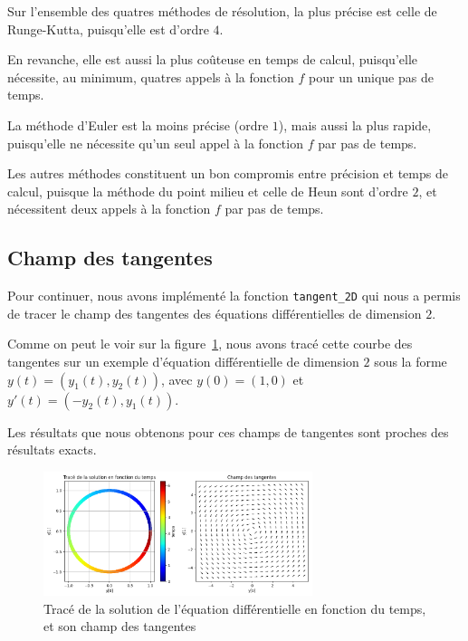 Sur l'ensemble des quatres méthodes de résolution, la plus précise est celle de Runge-Kutta, puisqu'elle est d'ordre $4$.

En revanche, elle est aussi la plus coûteuse en temps de calcul, puisqu'elle nécessite, au minimum, quatres appels à la fonction $f$ pour un unique pas de temps.

La méthode d'Euler est la moins précise (ordre $1$), mais aussi la plus rapide, puisqu'elle ne nécessite qu'un seul appel à la fonction $f$ par pas de temps.

Les autres méthodes constituent un bon compromis entre précision et temps de calcul, puisque la méthode du point milieu et celle de Heun sont d'ordre $2$, et nécessitent deux appels à la fonction $f$ par pas de temps.

\subsection{Champ des tangentes}
Pour continuer, nous avons implémenté la fonction \texttt{tangent\_2D} qui nous a permis de tracer le champ des tangentes
des équations différentielles de dimension $2$.

Comme on peut le voir sur la figure~\ref{fig:tangente}, nous avons tracé cette courbe des tangentes sur un exemple d'équation différentielle
de dimension $2$ sous la forme $y(t)=(y_1(t),y_2(t))$, avec $y(0)=(1,0)$ et $y'(t)=(-y_2(t),y_1(t))$.

Les résultats que nous obtenons pour ces champs de tangentes sont proches des résultats exacts.

\begin{figure}[htbp!]
	\centering
	\includegraphics[width=0.7\textwidth]{res/tangente}
	\caption{Tracé de la solution de l'équation différentielle en fonction du temps, et son champ des tangentes}
	\label{fig:tangente}
\end{figure}
